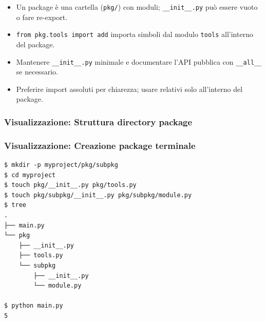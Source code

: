 \begin{tcolorbox}[title=Spiegazione]
\begin{itemize}
  \item Un package è una cartella (\texttt{pkg/}) con moduli; \texttt{\_\_init\_\_.py} può essere vuoto o fare re-export.
  \item \texttt{from pkg.tools import add} importa simboli dal modulo \texttt{tools} all'interno del package.
  \item Mantenere \texttt{\_\_init\_\_.py} minimale e documentare l'API pubblica con \verb|__all__| se necessario.
  \item Preferire import assoluti per chiarezza; usare relativi solo all'interno del package.
\end{itemize}
\end{tcolorbox}

\subsubsection{Visualizzazione: Struttura directory package}
\begin{center}
\end{center}

\subsubsection{Visualizzazione: Creazione package terminale}
\begin{center}
\begin{tcolorbox}[colback=black!5, colframe=black!75, title=Terminal Output, fonttitle=\ttfamily\bfseries]
\begin{lstlisting}[style=python]
$ mkdir -p myproject/pkg/subpkg
$ cd myproject
$ touch pkg/__init__.py pkg/tools.py
$ touch pkg/subpkg/__init__.py pkg/subpkg/module.py
$ tree
.
├── main.py
└── pkg
    ├── __init__.py
    ├── tools.py
    └── subpkg
        ├── __init__.py
        └── module.py

$ python main.py
5
\end{lstlisting}
\end{tcolorbox}
\end{center}

